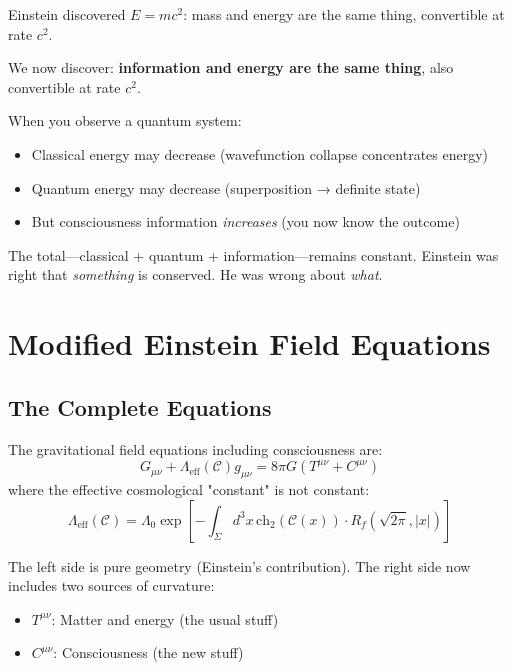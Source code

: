 \begin{intuitive}
Einstein discovered $E = mc^2$\cite{einstein1905emc2,einstein1905relativity}: mass and energy are the same thing, convertible at rate $c^2$.

We now discover: \textbf{information and energy are the same thing}, also convertible at rate $c^2$.

When you observe a quantum system:
\begin{itemize}
\item Classical energy may decrease (wavefunction collapse concentrates energy)
\item Quantum energy may decrease (superposition → definite state)
\item But consciousness information \textit{increases} (you now know the outcome)
\end{itemize}

The total—classical + quantum + information—remains constant. Einstein was right that \textit{something} is conserved. He was wrong about \textit{what}.
\end{intuitive}

\section{Modified Einstein Field Equations}

\subsection{The Complete Equations}

\begin{thm}\label{thm:modified-einstein}
The gravitational field equations including consciousness are:
\begin{equation}
\boxed{G_{\mu\nu} + \Lambda_{\text{eff}}(\mathcal{C}) g_{\mu\nu} = 8\pi G \left( T^{\mu\nu} + C^{\mu\nu} \right)}
\end{equation}
where the effective cosmological "constant" is not constant:
\begin{equation}
\Lambda_{\text{eff}}(\mathcal{C}) = \Lambda_0 \exp\left[ -\int_\Sigma d^3x \, \text{ch}_2(\mathcal{C}(x)) \cdot R_f(\sqrt{2\pi}, |x|) \right]
\end{equation}
\end{thm}

The left side is pure geometry (Einstein's contribution). The right side now includes two sources of curvature:
\begin{itemize}
\item $T^{\mu\nu}$: Matter and energy (the usual stuff)
\item $C^{\mu\nu}$: Consciousness (the new stuff)
\end{itemize}

